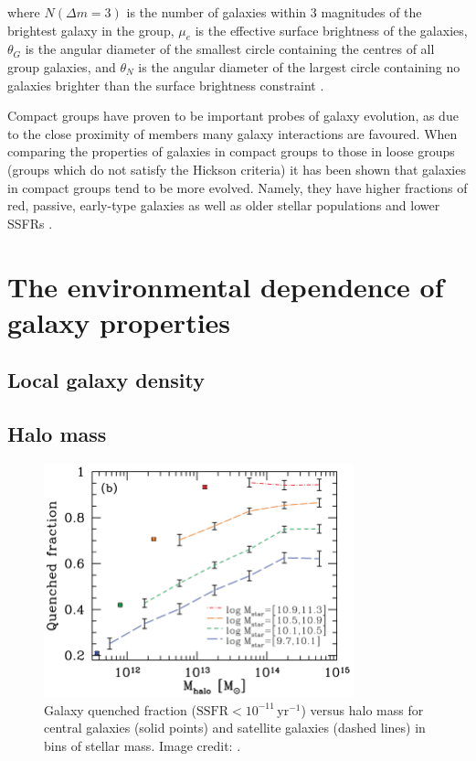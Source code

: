 \noindent
where $N(\Delta m = 3)$ is the number of galaxies within 3 magnitudes
of the brightest galaxy in the group, $\mu_e$ is the effective surface
brightness of the galaxies, $\theta_G$ is the angular diameter of the
smallest circle containing the centres of all group galaxies, and
$\theta_N$ is the angular diameter of the largest circle containing no
galaxies brighter than the surface brightness constraint
\citep{hickson1982, mcconnachie2009}.
\par
Compact groups have proven to be important probes of galaxy evolution,
as due to the close proximity of members many galaxy interactions are
favoured.  When comparing the properties of galaxies in compact groups
to those in loose groups (groups which do not satisfy the Hickson
criteria) it has been shown that galaxies in compact groups tend to be
more evolved.  Namely, they have higher fractions of red, passive,
early-type galaxies as well as older stellar populations and lower
SSFRs \citep{coenda2012, coenda2015}.

\section{The environmental dependence of galaxy properties}
\label{sec:enviro_dependence}

\subsection{Local galaxy density}
\label{sec:local_density}

\subsection{Halo mass}
\label{sec:halo_mass}

\begin{figure}
  \centering
  \includegraphics[width=0.8\textwidth]{quenchFrac_wetzel.png}
  \caption{Galaxy quenched fraction ($\mathrm{SSFR} <
    10^{-11}\,\mathrm{yr^{-1}}$) versus halo mass for central galaxies
    (solid points) and satellite galaxies (dashed lines) in bins of stellar mass.  Image credit: \citet{wetzel2012}.}
  \label{fig:quenchFrac_wetzel}
\end{figure}


